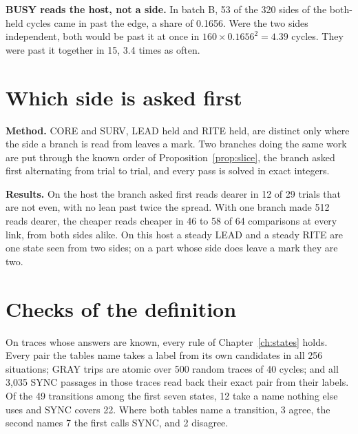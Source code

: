 \textbf{BUSY reads the host, not a side.} In batch B, 53 of the 320 sides of the both-held cycles
came in past the edge, a share of 0.1656. Were the two sides independent, both would be past it at
once in \(160 \times 0.1656^2 = 4.39\) cycles. They were past it together in 15, 3.4 times as often.

\section{Which side is asked first}
\label{sec:side}

\textbf{Method.} CORE and SURV, LEAD held and RITE held, are distinct only where the side a branch
is read from leaves a mark. Two branches doing the same work are put through the known order of
Proposition~\ref{prop:slice}, the branch asked first alternating from trial to trial, and every
pass is solved in exact integers.

\textbf{Results.} On the host the branch asked first reads dearer in 12 of 29 trials that are not
even, with no lean past twice the spread. With one branch made 512 reads dearer, the cheaper reads
cheaper in 46 to 58 of 64 comparisons at every link, from both sides alike. On this host a steady
LEAD and a steady RITE are one state seen from two sides; on a part whose side does leave a mark
they are two.

\section{Checks of the definition}

On traces whose answers are known, every rule of Chapter~\ref{ch:states} holds. Every pair the
tables name takes a label from its own candidates in all 256 situations; GRAY trips are atomic
over 500 random traces of 40 cycles; and all 3,035 SYNC passages in those traces read back their
exact pair from their labels. Of the 49 transitions among the first seven states, 12 take a name
nothing else uses and SYNC covers 22. Where both tables name a transition, 3 agree, the second
names 7 the first calls SYNC, and 2 disagree.
